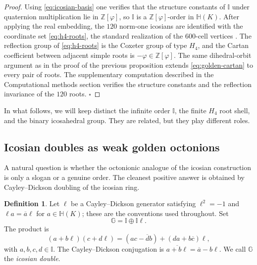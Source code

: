 \documentclass[12pt,oneside,english]{amsart}
\numberwithin{equation}{section}
\numberwithin{figure}{section}
\numberwithin{table}{section}
\theoremstyle{plain}
\theoremstyle{definition}
\newtheorem{definition}[theorem]{Definition}
\theoremstyle{remark}
\newcommand{\HH}{\mathbb H}
\newcommand{\Zphi}{\mathbb Z[\varphi]}
\begin{document}
\begin{proof}
Using \eqref{eq:icosian-basis} one verifies that the structure constants of \(\mathbb I\) under quaternion multiplication lie in \(\Zphi\), so \(\mathbb I\) is a \(\Zphi\)-order in \(\HH(K)\). After applying the real embedding, the \(120\) norm-one icosians are identified with the coordinate set \eqref{eq:h4-roots}, the standard realization of the \(600\)-cell vertices \cite{Conway,Ti80,Wi86}. The reflection group of \eqref{eq:h4-roots} is the Coxeter group of type \(H_4\), and the Cartan coefficient between adjacent simple roots is \(-\varphi\in\Zphi\). The same dihedral-orbit argument as in the proof of the previous proposition extends \eqref{eq:golden-cartan} to every pair of roots. The supplementary computation described in the Computational methods section verifies the structure constants and the reflection invariance of the \(120\) roots. \(\square\)
\end{proof}

In what follows, we will keep distinct the infinite order \(\mathbb I\), the finite \(H_4\) root shell, and the binary icosahedral group. They are related, but they play different roles.

\subsection{Icosian doubles as weak golden octonions}

A natural question is whether the octonionic analogue of the icosian construction is only a slogan or a genuine order. The cleanest positive answer is obtained by Cayley--Dickson doubling of the icosian ring.

\begin{definition}
\label{def:icosian-double}
Let \(\ell\) be a Cayley--Dickson generator satisfying \(\ell^2=-1\) and \(\ell a=\overline{a}\ell\) for \(a\in\HH(K)\); these are the conventions used throughout. Set
\begin{equation}
\mathbb G=\mathbb I\oplus \mathbb I\ell.
\label{eq:golden-octonion-double}
\end{equation}
The product is
\begin{equation}
(a+b\ell)(c+d\ell)=(ac-\overline d b)+(da+b\overline c)\ell,
\label{eq:cayley-dickson-product}
\end{equation}
with \(a,b,c,d\in\mathbb I\). The Cayley--Dickson conjugation is \(\overline{a+b\ell}=\overline{a}-b\ell\). We call \(\mathbb G\) the \emph{icosian double}.
\end{definition}
\end{document}
